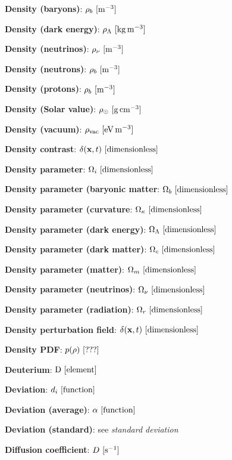 \documentclass[a4paper,10pt]{article}
\begin{document}
{\noindent}\textbf{Density (baryons)}: $\rho_b ~ [{\rm m^{-3}}]$

{\noindent}\textbf{Density (dark energy)}: $\rho_\Lambda ~ [{\rm kg\,m^{-3}}]$

{\noindent}\textbf{Density (neutrinos)}: $\rho_\nu ~ [{\rm m^{-3}}]$

{\noindent}\textbf{Density (neutrons)}: $\rho_b ~ [{\rm m^{-3}}]$

{\noindent}\textbf{Density (protons)}: $\rho_b ~ [{\rm m^{-3}}]$

{\noindent}\textbf{Density (Solar value)}: $\rho_\odot ~ [{\rm g\,cm^{-3}}]$

{\noindent}\textbf{Density (vacuum)}: $\rho_\mathrm{vac} ~ [{\rm eV\,m^{-3}}]$

{\noindent}\textbf{Density contrast}: $\delta(\mathbf{x},t) ~ [{\rm dimensionless}]$

{\noindent}\textbf{Density parameter}: $\Omega_i ~ [{\rm dimensionless}]$

{\noindent}\textbf{Density parameter (baryonic matter}: $\Omega_b ~
[{\rm dimensionless}]$

{\noindent}\textbf{Density parameter (curvature}: $\Omega_\kappa ~ [{\rm dimensionless}]$

{\noindent}\textbf{Density parameter (dark energy)}: $\Omega_\Lambda ~ [{\rm dimensionless}]$

{\noindent}\textbf{Density parameter (dark matter)}: $\Omega_c ~ [{\rm dimensionless}]$

{\noindent}\textbf{Density parameter (matter)}: $\Omega_m ~ [{\rm dimensionless}]$

{\noindent}\textbf{Density parameter (neutrinos)}: $\Omega_\nu ~ [{\rm dimensionless}]$

{\noindent}\textbf{Density parameter (radiation)}: $\Omega_r ~ [{\rm dimensionless}]$

{\noindent}\textbf{Density perturbation field}: $\delta(\mathbf{x},t) ~ [{\rm dimensionless}]$

{\noindent}\textbf{Density PDF}: $p(\rho) ~ [{\rm ???}]$

{\noindent}\textbf{Deuterium}: ${\rm D} ~ [{\rm element}]$

{\noindent}\textbf{Deviation}: $d_i ~ [{\rm function}]$

{\noindent}\textbf{Deviation (average)}: $\alpha ~ [{\rm function}]$

{\noindent}\textbf{Deviation (standard)}: see \textit{standard deviation}

{\noindent}\textbf{Diffusion coefficient}: $D ~ [{\rm s^{-1}}]$
\end{document}
